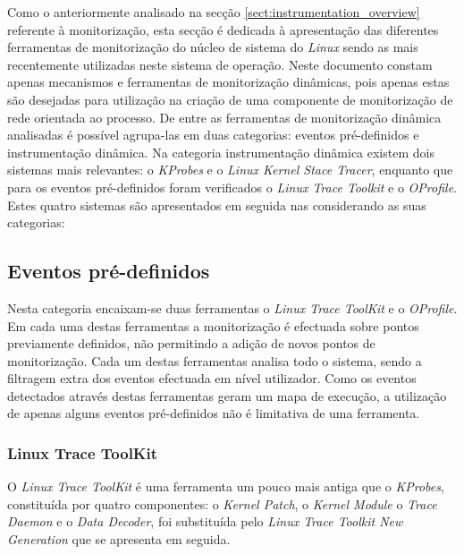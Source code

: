 Como o anteriormente analisado na secção \ref{sect:instrumentation_overview} referente à monitorização, esta secção é dedicada à apresentação das diferentes ferramentas de monitorização do núcleo de sistema do \textit{Linux} sendo as mais recentemente utilizadas neste sistema de operação.
Neste documento constam apenas mecanismos e ferramentas de monitorização dinâmicas, pois apenas estas são desejadas para utilização na criação de uma componente de monitorização de rede orientada ao processo.
De entre as ferramentas de monitorização dinâmica analisadas é possível agrupa-las em duas categorias: eventos pré-definidos e instrumentação dinâmica.
Na categoria instrumentação dinâmica existem dois sistemas mais relevantes: o \textit{KProbes} e o \textit{Linux Kernel Stace Tracer}, enquanto que para os eventos pré-definidos foram verificados o \textit{Linux Trace Toolkit} e o \textit{OProfile}.
Estes quatro sistemas são apresentados em seguida nas considerando as suas categorias:

\subsection{Eventos pré-definidos}

Nesta categoria encaixam-se duas ferramentas o \textit{Linux Trace ToolKit} e o \textit{OProfile}.
Em cada uma destas ferramentas a monitorização é efectuada sobre pontos previamente definidos, não permitindo a adição de novos pontos de monitorização.
Cada um destas ferramentas analisa todo o sistema, sendo a filtragem extra dos eventos efectuada em nível utilizador.
Como os eventos detectados através destas ferramentas geram um mapa de execução, a utilização de apenas alguns eventos pré-definidos não é limitativa de uma ferramenta.

\subsubsection{Linux Trace ToolKit}\label{cap:linux_trace_toolkit_overview}

O \textit{Linux Trace ToolKit} é uma ferramenta um pouco mais antiga que o \textit{KProbes}, constituída por quatro componentes: o \textit{Kernel Patch}, o \textit{Kernel Module} o \textit{Trace Daemon} e o \textit{Data Decoder}, foi substituída pelo \textit{Linux Trace Toolkit New Generation} que se apresenta em seguida.

